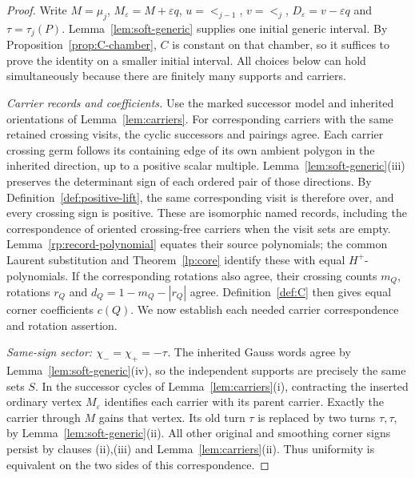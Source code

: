 \begin{proof}
Write $M=\mu_j$, $M_\varepsilon=M+\varepsilon q$,
$u=\lt_{j-1}$, $v=\lt_j$, $D_\varepsilon=v-\varepsilon q$
and $\tau=\tau_j(P)$. Lemma~\ref{lem:soft-generic} supplies
one initial generic interval. By Proposition~\ref{prop:C-chamber},
$C$ is constant on that chamber, so it suffices to prove the identity
on a smaller initial interval. All choices below can hold
simultaneously because there are finitely many supports and carriers.

\emph{Carrier records and coefficients.}
Use the marked successor model and inherited orientations of
Lemma~\ref{lem:carriers}. For corresponding carriers with the same
retained crossing visits, the cyclic successors and pairings agree.
Each carrier crossing germ follows its containing edge of its own
ambient polygon in the inherited direction, up to a positive scalar
multiple.
Lemma~\ref{lem:soft-generic}(iii) preserves the determinant sign
of each ordered pair of those directions. By
Definition~\ref{def:positive-lift}, the same corresponding visit
is therefore over, and every crossing sign is positive. These
are isomorphic named records, including the correspondence of
oriented crossing-free carriers when the visit sets are empty.
Lemma~\ref{rp:record-polynomial} equates their source polynomials;
the common Laurent substitution and Theorem~\ref{lp:core} identify
these with equal $H^+$-polynomials. If the corresponding rotations
also agree, their crossing counts $m_Q$, rotations $r_Q$ and
$d_Q=1-m_Q-|r_Q|$ agree. Definition~\ref{def:C} then gives equal
corner coefficients $c(Q)$. We now establish each needed carrier
correspondence and rotation assertion.

\emph{Same-sign sector: $\chi_-=\chi_+=-\tau$.}
The inherited Gauss words agree by Lemma~\ref{lem:soft-generic}(iv),
so the independent supports are precisely the same sets $S$.
In the successor cycles of Lemma~\ref{lem:carriers}(i), contracting
the inserted ordinary vertex $M_\varepsilon$ identifies each
carrier with its parent carrier. Exactly the carrier through $M$
gains that vertex. Its old turn $\tau$ is replaced by two turns
$\tau,\tau$, by Lemma~\ref{lem:soft-generic}(ii). All other
original and smoothing corner signs persist by clauses (ii),(iii)
and Lemma~\ref{lem:carriers}(ii). Thus uniformity is equivalent
on the two sides of this correspondence.


\end{proof}
